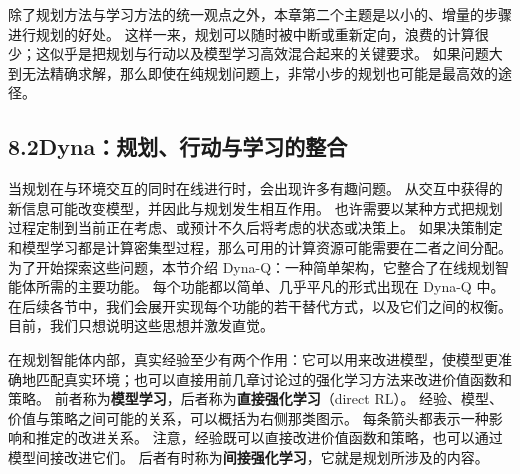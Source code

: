 \documentclass[UTF8, 12pt, fontset=fandol, oneside]{ctexart}
\begin{document}
\begin{center}
\end{center}

除了规划方法与学习方法的统一观点之外，本章第二个主题是以小的、增量的步骤进行规划的好处。
这样一来，规划可以随时被中断或重新定向，浪费的计算很少；这似乎是把规划与行动以及模型学习高效混合起来的关键要求。
如果问题大到无法精确求解，那么即使在纯规划问题上，非常小步的规划也可能是最高效的途径。

\subsection*{8.2\quad Dyna：规划、行动与学习的整合}

当规划在与环境交互的同时在线进行时，会出现许多有趣问题。
从交互中获得的新信息可能改变模型，并因此与规划发生相互作用。
也许需要以某种方式把规划过程定制到当前正在考虑、或预计不久后将考虑的状态或决策上。
如果决策制定和模型学习都是计算密集型过程，那么可用的计算资源可能需要在二者之间分配。
为了开始探索这些问题，本节介绍 Dyna-Q：一种简单架构，它整合了在线规划智能体所需的主要功能。
每个功能都以简单、几乎平凡的形式出现在 Dyna-Q 中。
在后续各节中，我们会展开实现每个功能的若干替代方式，以及它们之间的权衡。
目前，我们只想说明这些思想并激发直觉。

在规划智能体内部，真实经验至少有两个作用：它可以用来改进模型，使模型更准确地匹配真实环境；也可以直接用前几章讨论过的强化学习方法来改进价值函数和策略。
前者称为\textbf{模型学习}，后者称为\textbf{直接强化学习}（direct RL）。
经验、模型、价值与策略之间可能的关系，可以概括为右侧那类图示。
每条箭头都表示一种影响和推定的改进关系。
注意，经验既可以直接改进价值函数和策略，也可以通过模型间接改进它们。
后者有时称为\textbf{间接强化学习}，它就是规划所涉及的内容。
\end{document}

